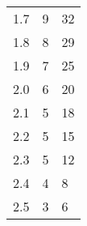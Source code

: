 \begin{table}[H]
{\begin{tabular}{|l|l|l|}
1.7                      & 9                                                                                                                   & 32                                                                                                                 \\
1.8                      & 8                                                                                                                   & 29                                                                                                                 \\
1.9                      & 7                                                                                                                   & 25                                                                                                                 \\
2.0                      & 6                                                                                                                   & 20                                                                                                                 \\
2.1                      & 5                                                                                                                   & 18                                                                                                                 \\
2.2                      & 5                                                                                                                   & 15                                                                                                                 \\
2.3                      & 5                                                                                                                   & 12                                                                                                                 \\
2.4                      & 4                                                                                                                   & 8                                                                                                                  \\
2.5                      & 3                                                                                                                   & 6                                                                                                                  \\

\end{tabular}}
\end{table}
